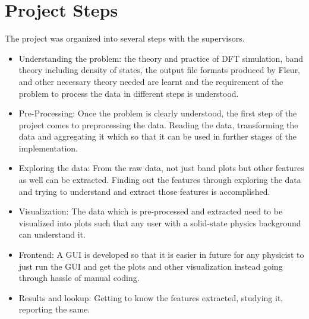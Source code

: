 


\section{Project Steps}
\label{sec:steps}

The project was organized into several steps with the supervisors.
\begin{itemize}
\item Understanding the problem: the theory and practice of DFT simulation, band
    theory including density of states, the output file formats produced by
    Fleur, and other necessary theory needed are learnt and the requirement of
    the problem to process the data in different steps is understood.
\item Pre-Processing: Once the problem is clearly understood, the first step of
    the project comes to preprocessing the data. Reading the data, transforming
    the data and aggregating it which so that it can be used in further stages of
    the implementation.
\item Exploring the data: From the raw data, not just band plots but other 
    features as well can be extracted. Finding out the features through exploring the
    data and trying to understand and extract those features is accomplished.
\item Visualization: The data which is pre-processed and extracted need to be
    visualized into plots such that any user with a solid-state physics background
    can understand it.
\item Frontend: A GUI is developed so that it is easier in future for any
    physicist to just run the GUI and get the plots and other visualization
    instead going through hassle of manual coding.
\item Results and lookup: Getting to know the features extracted, studying it,
    reporting the same.
\end{itemize}


